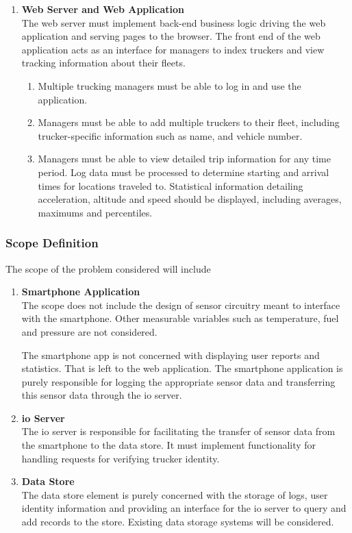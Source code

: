\begin{enumerate}
\item \textbf{Web Server and Web Application}\\
The web server must implement back-end business logic driving the web application and serving pages to the browser.
The front end of the web application acts as an interface for managers to index truckers and view tracking information about their fleets.
    \begin{enumerate}
        \item Multiple trucking managers must be able to log in and use the application.
        \item Managers must be able to add multiple truckers to their fleet, including trucker-specific information such as name, and vehicle number.
        \item Managers must be able to view detailed trip information for any time period. Log data must be processed to determine starting and arrival times for locations traveled to. Statistical information detailing acceleration, altitude and speed should be displayed, including averages, maximums and percentiles.
    \end{enumerate}
\end{enumerate}
\subsubsection{Scope Definition}
The scope of the problem considered will include
\begin{enumerate}
\item \textbf{Smartphone Application}\\
The scope does not include the design of sensor circuitry meant to interface with the smartphone. 
Other measurable variables such as temperature, fuel and pressure are not considered.

The smartphone app is not concerned with displaying user reports and statistics. That is left to the web application.
The smartphone application is purely responsible for logging the appropriate sensor data and transferring this sensor data through the \ac{io} server.
\item \textbf{\ac{io} Server}\\
The \ac{io} server is responsible for facilitating the transfer of sensor data from the smartphone to the data store.
It must implement functionality for handling requests for verifying trucker identity. 
\item \textbf{Data Store}\\
The data store element is purely concerned with the storage of logs, user identity information and providing an interface for the \ac{io} server to query and add records to the store.
Existing data storage systems will be considered.
\end{enumerate}

